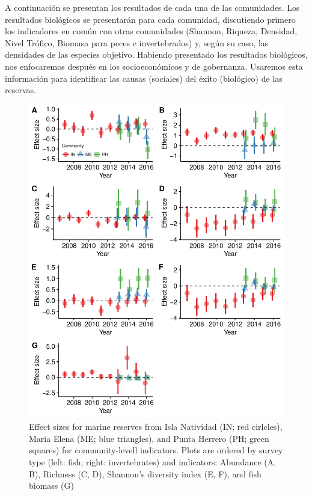 \documentclass{frontiersSCNS}
\theoremstyle{definition}
\theoremstyle{definition}
\theoremstyle{definition}
\theoremstyle{remark}
\begin{document}
A continuación se presentan los resultados de cada una de las
comunidades. Los resultados biológicos se presentarán para cada
comunidad, discutiendo primero los indicadores en común con otras
comunidades (Shannon, Riqueza, Densidad, Nivel Trófico, Biomasa para
peces e invertebrados) y, según su caso, las densidades de las especies
objetivo. Habiendo presentado los resultados biológicos, nos enfocaremos
después en los socioeconómicos y de gobernanza. Usaremos esta
información para identificar las causas (sociales) del éxito (biológico)
de las reservas.

\begin{figure}
\centering
\includegraphics{Villasenor-Derbez_files/figure-latex/unnamed-chunk-3-1.pdf}
\caption{\label{fig:unnamed-chunk-3}\label{fig:indicators}Effect sizes for
marine reserves from Isla Natividad (IN; red cirlcles), Maria Elena (ME;
blue triangles), and Punta Herrero (PH; green squares) for
community-levell indicators. Plots are ordered by survey type (left:
fish; right: invertebrates) and indicators: Abundance (A, B), Richness
(C, D), Shannon's diversity index (E, F), and fish biomass (G)}
\end{figure}
\end{document}
